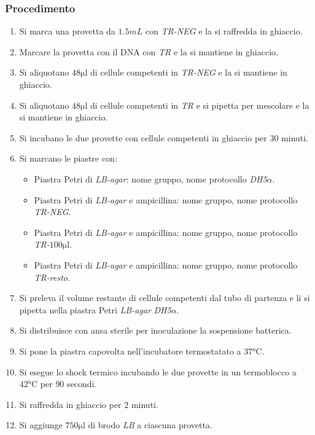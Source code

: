 		\subsubsection{Procedimento}
		\begin{enumerate}
			\item Si marca una provetta da $1.5\si{mL}$ con \emph{TR-NEG} e la si raffredda in ghiaccio.
			\item Marcare la provetta con il DNA con \emph{TR} e la si mantiene in ghiaccio.
			\item Si aliquotano $48\si{\micro\litre}$ di cellule competenti in \emph{TR-NEG} e la si mantiene in ghiaccio.
			\item Si aliquotano $48\si{\micro\litre}$ di cellule competenti in \emph{TR} e si pipetta per mescolare e la si mantiene in ghiaccio.
			\item Si incubano le due provette con cellule competenti in ghiaccio per $30$ minuti.
			\item Si marcano le piastre con:
				\begin{multicols}{2}
					\begin{itemize}
						\item Piastra Petri di \emph{LB-agar}: nome gruppo, nome protocollo \emph{DH5$\alpha$}.
						\item Piastra Petri di \emph{LB-agar} e ampicillina: nome gruppo, nome protocollo \emph{TR-NEG}.
						\item Piastra Petri di \emph{LB-agar} e ampicillina: nome gruppo, nome protocollo \emph{TR-$100\si{\micro\litre}$}.
						\item Piastra Petri di \emph{LB-agar} e ampicillina: nome gruppo, nome protocollo \emph{TR-resto}.
					\end{itemize}
				\end{multicols}
			\item Si preleva il volume restante di cellule competenti dal tubo di partenza e li si pipetta nella piastra Petri \emph{LB-agar} \emph{DH5$\alpha$}.
			\item Si distribuisce con ansa sterile per inoculazione la sospensione batterica.
			\item Si pone la piastra capovolta nell'incubatore termostatato a $37\si{\celsius}$.
			\item Si esegue lo shock termico incubando le due provette in un termoblocco a $42\si{\celsius}$ per $90$ secondi.
			\item Si raffredda in ghiaccio per $2$ minuti.
			\item Si aggiunge $750\si{\micro\litre}$ di brodo \emph{LB} a ciascuna provetta.

\end{enumerate}
